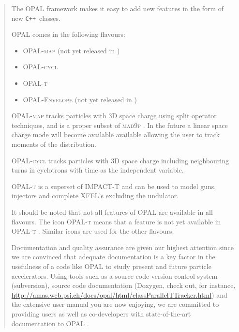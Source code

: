 \documentclass[12pt,a4paper]{report}
\newcommand{\opalversion}{\text{1.1.3 }}
\newcommand{\madninep}{\textsc{mad9p }}
\newcommand{\opal}{\textsc{OPAL }}
\newcommand{\opalt}{\textsc{OPAL-t }}
\newcommand{\opalcycl}{\textsc{OPAL-cycl }}
\newcommand{\opalmap}{\textsc{OPAL-map }}
\newcommand{\opalenv}{\textsc{OPAL-Envelope }}
\newcommand{\noopalt}{\leftthumbsdown \opalt }
\begin{document}
\begin{titlepage}
\begin{quotation}
The \opal framework makes it easy to add new features in the form of new
\texttt{C++}~classes.

OPAL comes in the following flavours:
\begin{itemize}
\item \opalmap (not yet released in \opalversion)
\item \opalcycl 
\item \opalt
\item \opalenv (not yet released in \opalversion)
\end{itemize}

\opalmap tracks particles with 3D space charge using split operator techniques, and is a proper subset of \madninep. In the future 
a linear space charge mode will become available available
allowing the user to track moments of the distribution. 

\opalcycl tracks particles with 3D space charge including neighbouring turns in cyclotrons
with time as the independent variable. 

\opalt is a superset of IMPACT-T \cite{qiang2005} and can be used to model guns, injectors and complete XFEL's excluding the undulator.

It should be noted that not all features of \opal are available in all flavours. The icon \noopalt means that a feature is not yet 
available in \opalt. Similar icons are used for the other flavours. 

Documentation and quality assurance are given our highest attention since we are convinced that adequate documentation 
is a key factor in the usefulness of a code like \opal to study present and future particle accelerators. 
 Using tools such as a source code version
control system (subversion), source code documentation (Doxygen, check out, for instance,  \url{http://amas.web.psi.ch/docs/opal/html/classParallelTTracker.html}) and the extensive user manual
you are now enjoying, we are committed to providing users as well as co-developers with 
state-of-the-art documentation to \opal.

\end{quotation}
\vfill
\end{titlepage}

\tableofcontents
\listoftables
\listoffigures



 













\appendix




\printindex
\end{document}
